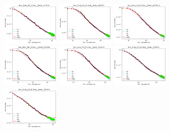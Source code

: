 \documentclass{article} %
\begin{document}
\begin{figure}[!htb]
\includegraphics[width=0.245\textwidth]{figures/scaling_laws_benchmark_dataset_plots__all_functional_forms/birds_5___ViT_S_16.png}
\includegraphics[width=0.245\textwidth]{figures/scaling_laws_benchmark_dataset_plots__all_functional_forms/birds_10___BiT_50_1.png}
\includegraphics[width=0.245\textwidth]{figures/scaling_laws_benchmark_dataset_plots__all_functional_forms/birds_10___BiT_101_3.png}
\includegraphics[width=0.245\textwidth]{figures/scaling_laws_benchmark_dataset_plots__all_functional_forms/birds_10___MiX_B_16.png}
\includegraphics[width=0.245\textwidth]{figures/scaling_laws_benchmark_dataset_plots__all_functional_forms/birds_10___MiX_L_16.png}
\includegraphics[width=0.245\textwidth]{figures/scaling_laws_benchmark_dataset_plots__all_functional_forms/birds_10___ViT_B_16.png}
\includegraphics[width=0.245\textwidth]{figures/scaling_laws_benchmark_dataset_plots__all_functional_forms/birds_10___ViT_S_16.png}

\end{figure}
\end{document}
